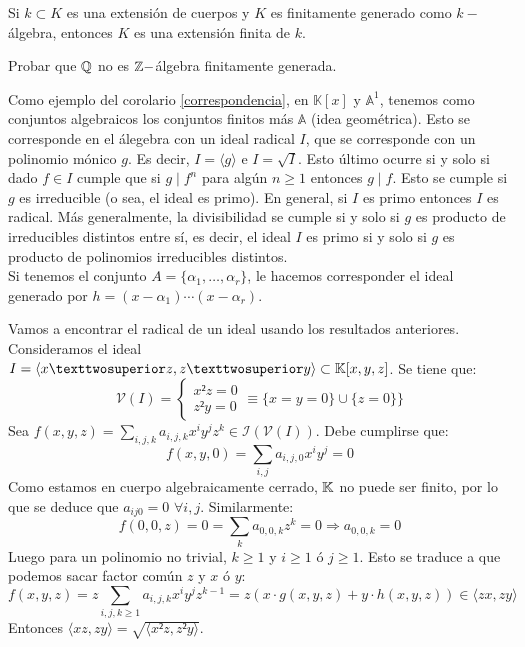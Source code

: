 \documentclass[ACGA.tex]{subfiles}
\begin{document}
\begin{prop}
Si $k\subset K$ es una extensión de cuerpos y $K$ es finitamente generado como $k-$álgebra, entonces $K$ es una extensión finita de $k$. 
\end{prop}

\begin{ejer}
Probar que $\mathbb{Q}$ no es $\mathbb{Z}-$álgebra finitamente generada. 
\end{ejer}

\begin{ej}
Como ejemplo del corolario \ref{correspondencia}, en $\mathbb{K}[x]$ y $\mathbb{A}^1$, tenemos como conjuntos algebraicos los conjuntos finitos más $\mathbb{A}$ (idea geométrica). Esto se corresponde en el álegebra con un ideal radical $I$, que se corresponde con un polinomio mónico $g$. Es decir, $I=\langle g\rangle$ e $I=\sqrt{I}$. Esto último ocurre si y solo si dado $f\in I$ cumple que  si $g\mid f^n$ para algún $n\geq 1$ entonces $g\mid f$. Esto se cumple si $g$ es irreducible (o sea, el ideal es primo). En general, si $I$ es primo entonces $I$ es radical. Más generalmente, la divisibilidad se cumple si y solo si $g$ es producto de irreducibles distintos entre sí, es decir, el ideal $I$ es primo si y solo si $g$ es producto de polinomios irreducibles distintos.\\
Si tenemos el conjunto $A=\{\alpha_1,\dots, \alpha_r\}$, le hacemos corresponder el ideal generado por $h=(x-\alpha_1)\cdots(x-\alpha_r)$. 
\end{ej}

\begin{ej} Vamos a encontrar el radical de un ideal usando los resultados anteriores. Consideramos el ideal $I = \langle x²z,z²y\rangle \subset \K[x,y,z]$. Se tiene que:
\[ \mathcal{V}(I) = \begin{cases}
	x²z = 0\\
	z²y = 0
\end{cases} \equiv \{x=y=0\}\cup\{ z=0\} \}\]
Sea $f(x,y,z) = \sum_{i,j,k}a_{i,j,k}x^iy^jz^k \in \mathcal{I}(\mathcal{V}(I))$. Debe cumplirse que:
\[ f(x,y,0) = \sum_{i,j}a_{i,j,0}x^iy^j = 0 \]
Como estamos en cuerpo algebraicamente cerrado, $\mathbb{K}$ no puede ser finito, por lo que se deduce que $a_{ij0}=0$ $\forall i,j$.
Similarmente:
\[ f(0,0,z) = 0 = \sum_{k}a_{0,0,k}z^k = 0 \Rightarrow a_{0,0,k} = 0 \]
Luego para un polinomio no trivial, $k ≥ 1$ y $i ≥ 1$ ó $j ≥ 1$. Esto se traduce a que podemos sacar factor común $z$ y $x$ ó $y$:
\[ f(x,y,z) = z \sum_{i,j,k ≥ 1} a_{i,j,k} x^iy^jz^{k-1} = z(x\cdot g(x,y,z)+y\cdot h(x,y,z)) \in \langle zx,zy \rangle \]
Entonces $\langle xz,zy\rangle = \sqrt{\langle x²z,z²y\rangle}$.
\end{ej}
\end{document}
